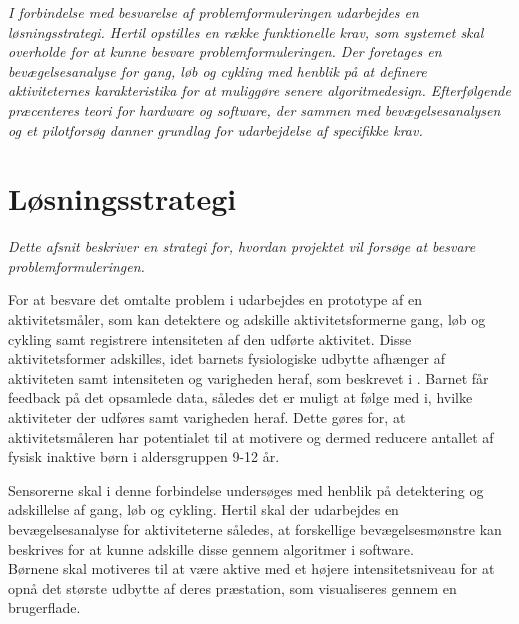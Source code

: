 \textit{I forbindelse med besvarelse af problemformuleringen udarbejdes en løsningsstrategi. Hertil opstilles en række funktionelle krav, som systemet skal overholde for at kunne besvare problemformuleringen. Der foretages en bevægelsesanalyse for gang, løb og cykling med henblik på at definere aktiviteternes karakteristika for at muliggøre senere algoritmedesign. Efterfølgende præcenteres teori for hardware og software, der sammen med bevægelsesanalysen og et pilotforsøg danner grundlag for udarbejdelse af specifikke krav.}

\section{Løsningsstrategi}
\textit{Dette afsnit beskriver en strategi for, hvordan projektet vil forsøge at besvare problemformuleringen.}

For at besvare det omtalte problem i  udarbejdes en prototype af en aktivitetsmåler, som kan detektere og adskille aktivitetsformerne gang, løb og cykling samt registrere intensiteten af den udførte aktivitet. Disse aktivitetsformer adskilles, idet barnets fysiologiske udbytte afhænger af aktiviteten samt intensiteten og varigheden heraf, som beskrevet i . Barnet får feedback på det opsamlede data, således det er muligt at følge med i, hvilke aktiviteter der udføres samt varigheden heraf. Dette gøres for, at aktivitetsmåleren har potentialet til at motivere og dermed reducere antallet af fysisk inaktive børn i aldersgruppen 9-12 år.

Sensorerne skal i denne forbindelse undersøges med henblik på detektering og adskillelse af gang, løb og cykling. Hertil skal der udarbejdes en bevægelsesanalyse for aktiviteterne således, at forskellige bevægelsesmønstre kan beskrives for at kunne adskille disse gennem algoritmer i software.\\
Børnene skal motiveres til at være aktive med et højere intensitetsniveau for at opnå det største udbytte af deres præstation, som visualiseres gennem en brugerflade. 


